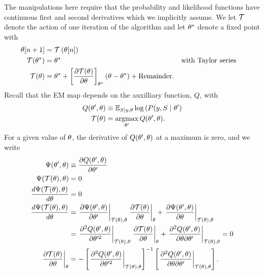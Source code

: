 The manipulations here require that the probability and likelihood
functions have continuous first and second derivatives which we
implicitly assume.  We let $\EMmap$ denote the action of one iteration
of the algorithm and let ${\theta^*}$ denote a fixed point with
\begin{align*}
  \ti{\parameters}{n+1} &= \EMmap\left( \ti{\parameters}{n} \right) \\
  \EMmap(\EMfixedPoint) &= \EMfixedPoint && \text{with Taylor series} \\
  \EMmap(\parameters) &= \EMfixedPoint + \left[ \frac{\partial
                 \EMmap(\parameters)}{\partial \parameters} \right]_{\EMfixedPoint} (\parameters - \EMfixedPoint) + \text{Remainder}.
\end{align*}
Recall that the EM map depends on the auxilliary function, $Q$, with
\begin{align*}
  Q(\NewParameters, \OldParameters) &\equiv \EV_{S \given y,\OldParameters} \log\left(P(y,S \given
  \NewParameters \right) \\
  \EMmap(\OldParameters) &= \argmax_{\NewParameters} Q(\NewParameters, \OldParameters). 
\end{align*}
For a given value of $\theta$, the derivative of $Q(\theta',
\theta)$ at a maximum is zero, and we write
\begin{align}
  \nonumber
  \Psi(\NewParameters,\OldParameters)
  &\equiv \frac{\partial Q(\NewParameters,
    \OldParameters)}{\partial \NewParameters} \\
  \nonumber
  \Psi(\EMmap(\OldParameters), \OldParameters)
  &= 0 \\
  \nonumber
  \frac{d\Psi(\EMmap(\OldParameters), \OldParameters)}{d \OldParameters}
  &= 0 \\
  \nonumber
  \frac{d\Psi(\EMmap(\OldParameters), \OldParameters)}{d \OldParameters}
  &= \left. \frac{\partial \Psi(\NewParameters, \OldParameters)}{\partial \NewParameters}
    \right|_{\EMmap(\OldParameters), \OldParameters} \left.\frac{\partial
    \EMmap(\parameters)}{\partial \parameters} \right|_{\OldParameters} +
    \left. \frac{\partial \Psi(\NewParameters, \OldParameters)}{\partial \OldParameters}
    \right|_{\EMmap(\OldParameters), \OldParameters} \\
  \nonumber
  &= \left. \frac{\partial^2 Q(\NewParameters, \OldParameters)}{\partial \NewParameters^2}
    \right|_{\EMmap(\OldParameters), \OldParameters} \left.\frac{\partial
    \EMmap(\parameters)}{\partial \parameters} \right|_{\OldParameters} +
    \left. \frac{\partial^2 Q(\NewParameters, \OldParameters)}{\partial \OldParameters
    \partial \NewParameters} \right|_{\EMmap(\OldParameters), \OldParameters} =0 \\
  \label{eq:two_second_derivatives}
  \left.\frac{\partial \EMmap(\parameters)}{\partial \parameters}
  \right|_{\OldParameters}
  &= - \left[ \left. \frac{\partial^2 Q(\NewParameters,  \OldParameters)}{\partial
    \NewParameters^2} \right|_{\EMmap(\OldParameters), \OldParameters} \right]^{-1} \left[
    \left. \frac{\partial^2 Q(\NewParameters, \OldParameters)}{\partial \OldParameters
    \partial \NewParameters} \right|_{\EMmap(\OldParameters), \OldParameters} \right].
\end{align}
